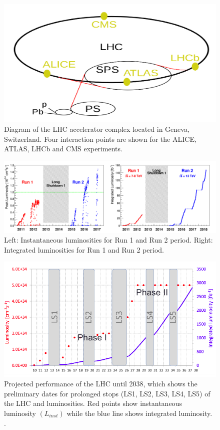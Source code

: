 \begin{figure}[H]
  \centering
  \includegraphics[width=0.8\columnwidth]{./LHCcomplex.png}
  \caption{\onehalfspacing Diagram of the LHC accelerator complex located in Geneva, Switzerland. Four interaction points are shown for the ALICE, ATLAS, LHCb and CMS experiments. \cite{Mobs:2684277}}
  \label{fig:LHC}
\end{figure}


\begin{figure}[H]
  \centering
  \includegraphics[width=1 \columnwidth]{./run1-2_lumi.png}
  \caption{\onehalfspacing Left: Instantaneous luminosities for Run 1 and Run 2 period. Right: Integrated luminosities for Run 1 and Run 2 period. \cite{lumi}}
  \label{fig:LHClumi}
\end{figure}


\begin{figure}[H]
  \centering
  \includegraphics[width=0.7 \columnwidth]{./lumi_projection.png}
  \caption{ \onehalfspacing Projected performance of the LHC until 2038, which shows the preliminary dates for prolonged stops (LS1, LS2, LS3, LS4, LS5) of the LHC and luminosities. Red points show instantaneous luminosity $(L_{inst})$ while the blue line shows integrated luminosity. \cite{collaborations2019report}.}
  \label{fig:LHCPlans}
\end{figure}
